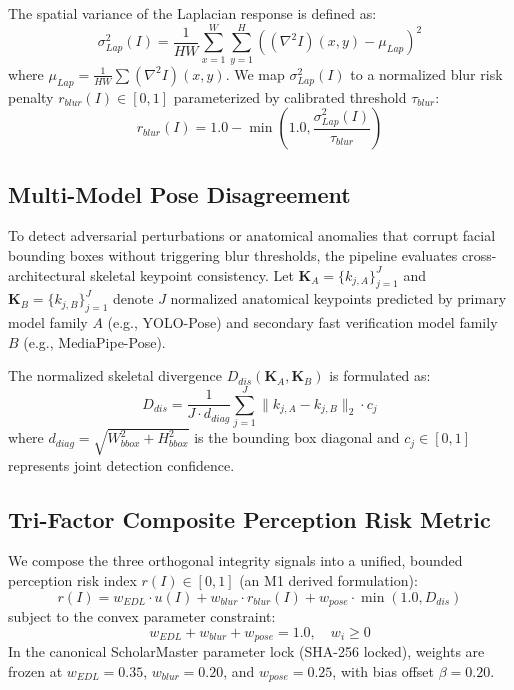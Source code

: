 \documentclass[10pt,journal,compsoc]{IEEEtran}
\begin{document}
The spatial variance of the Laplacian response is defined as:
\begin{equation}
\sigma_{Lap}^2(I) = \frac{1}{HW} \sum_{x=1}^W \sum_{y=1}^H \left( (\nabla^2 I)(x,y) - \mu_{Lap} \right)^2
\end{equation}
where $\mu_{Lap} = \frac{1}{HW} \sum (\nabla^2 I)(x,y)$. We map $\sigma_{Lap}^2(I)$ to a normalized blur risk penalty $r_{blur}(I) \in [0, 1]$ parameterized by calibrated threshold $\tau_{blur}$:
\begin{equation}
r_{blur}(I) = 1.0 - \min\left(1.0, \frac{\sigma_{Lap}^2(I)}{\tau_{blur}}\right)
\end{equation}

\subsection{Multi-Model Pose Disagreement}
To detect adversarial perturbations or anatomical anomalies that corrupt facial bounding boxes without triggering blur thresholds, the pipeline evaluates cross-architectural skeletal keypoint consistency. Let $\mathbf{K}_A = \{k_{j,A}\}_{j=1}^J$ and $\mathbf{K}_B = \{k_{j,B}\}_{j=1}^J$ denote $J$ normalized anatomical keypoints predicted by primary model family $A$ (e.g., YOLO-Pose) and secondary fast verification model family $B$ (e.g., MediaPipe-Pose).

The normalized skeletal divergence $D_{dis}(\mathbf{K}_A, \mathbf{K}_B)$ is formulated as:
\begin{equation}
D_{dis} = \frac{1}{J \cdot d_{diag}} \sum_{j=1}^J \| k_{j,A} - k_{j,B} \|_2 \cdot c_j
\end{equation}
where $d_{diag} = \sqrt{W_{bbox}^2 + H_{bbox}^2}$ is the bounding box diagonal and $c_j \in [0, 1]$ represents joint detection confidence.

\subsection{Tri-Factor Composite Perception Risk Metric}
We compose the three orthogonal integrity signals into a unified, bounded perception risk index $r(I) \in [0, 1]$ (an M1 derived formulation):
\begin{equation}
r(I) = w_{EDL} \cdot u(I) + w_{blur} \cdot r_{blur}(I) + w_{pose} \cdot \min(1.0, D_{dis})
\end{equation}
subject to the convex parameter constraint:
\begin{equation}
w_{EDL} + w_{blur} + w_{pose} = 1.0, \quad w_i \ge 0
\end{equation}
In the canonical ScholarMaster parameter lock (SHA-256 locked), weights are frozen at $w_{EDL} = 0.35$, $w_{blur} = 0.20$, and $w_{pose} = 0.25$, with bias offset $\beta = 0.20$.
\end{document}

